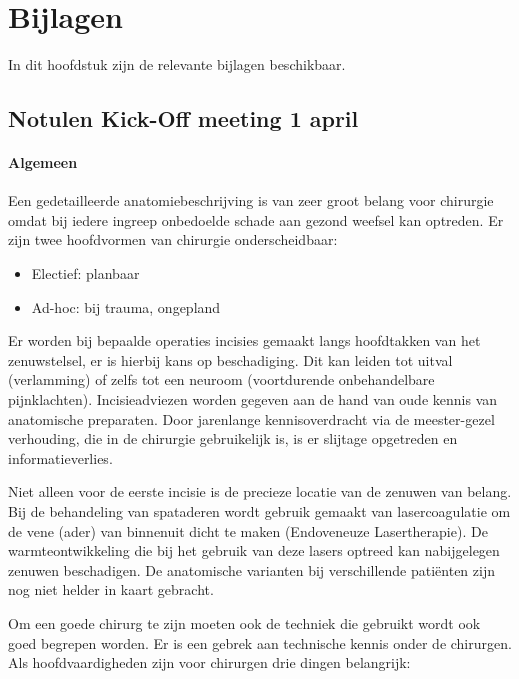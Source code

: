 \section{Bijlagen}

In dit hoofdstuk zijn de relevante bijlagen beschikbaar. 

\subsection{Notulen Kick-Off meeting 1 april}
\label{notulen}
\paragraph{Algemeen}

Een gedetailleerde anatomiebeschrijving is van zeer groot belang voor chirurgie omdat bij iedere ingreep onbedoelde schade aan gezond weefsel kan optreden. Er zijn twee hoofdvormen van chirurgie onderscheidbaar: 

\begin{itemize}
	\item Electief: planbaar 
	\item Ad-hoc: bij trauma, ongepland 
\end{itemize}

Er worden bij bepaalde operaties incisies gemaakt langs hoofdtakken van het zenuwstelsel, er is hierbij kans op beschadiging. Dit kan leiden tot uitval (verlamming) of zelfs tot een neuroom (voortdurende onbehandelbare pijnklachten). Incisieadviezen worden gegeven aan de hand van oude kennis van anatomische preparaten. Door jarenlange kennisoverdracht via de meester-gezel verhouding, die in de chirurgie gebruikelijk is, is er slijtage opgetreden en informatieverlies. 

Niet alleen voor de eerste incisie is de precieze locatie van de zenuwen van belang. Bij de behandeling van spataderen wordt gebruik gemaakt van lasercoagulatie om de vene (ader) van binnenuit dicht te maken (Endoveneuze Lasertherapie). De warmteontwikkeling die bij het gebruik van deze lasers optreed kan nabijgelegen zenuwen beschadigen. De anatomische varianten bij verschillende pati\"enten zijn nog niet helder in kaart gebracht. 

Om een goede chirurg te zijn moeten ook de techniek die gebruikt wordt ook goed begrepen worden. Er is een gebrek aan technische kennis onder de chirurgen. Als hoofdvaardigheden zijn voor chirurgen drie dingen belangrijk: 

